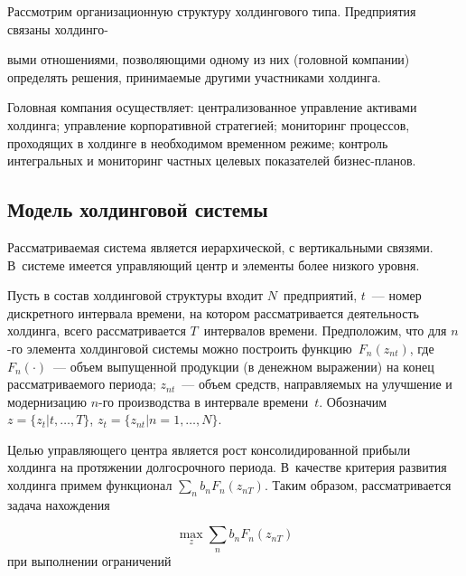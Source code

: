 \begin{multicols}{2}
\vspace*{-1pt}
     
     Рассмотрим организационную структуру холдингового типа. 
Предприятия связаны холдинго-\linebreak\vspace*{-12pt}
\pagebreak

\noindent
выми отношениями, позволяющими одному 
из них (головной компании) определять решения, принимаемые другими 
участниками холдинга. 
     
     Головная компания осуществляет: централизованное управление 
активами холдинга; управление корпоративной стратегией; мониторинг 
процессов, проходящих в холдинге в необходимом временном режиме; 
контроль интегральных и мониторинг частных целевых показателей 
     биз\-нес-планов.
     
\vspace*{-3pt}

\subsection{Модель холдинговой системы} %


     
     Рассматриваемая система является иерархической, с вертикальными 
связями. В~системе имеется управляющий центр и элементы более низкого 
уровня. 
     
     Пусть в состав холдинговой структуры входит $N$~предприятий, 
     $t$~--- номер дискретного интервала времени, на котором 
рассматривается деятельность холдинга, всего рассматривается 
$T$~интервалов времени. Предположим, что для $n$-го элемента 
холдинговой системы можно построить функцию~$F_n(z_{nt})$, где 
$F_n(\cdot)$~--- объем выпущенной продукции (в денежном выражении) на 
конец рассматриваемого периода; $z_{nt}$~--- объем средств, направляемых 
на улучшение и модернизацию $n$-го производства в интервале 
времени~$t$. Обозначим $z=\{ z_t\vert t, \ldots , T\}$, $z_t=\{z_{nt}\vert 
n=1,\ldots ,N\}$.
     
     Целью управляющего центра является рост консолидированной 
прибыли холдинга на протяжении долгосрочного периода. В~качестве 
критерия развития холдинга примем функционал $\sum\limits_n b_n 
F_n(z_{nT})$. Таким образом, рассматривается задача нахождения 

\noindent
     \begin{equation}
     \underset{z}{\max} \sum\limits_n b_n F_n(z_{nT})
     \label{e3.2.1d}
     \end{equation}
при выполнении ограничений


\end{multicols}
